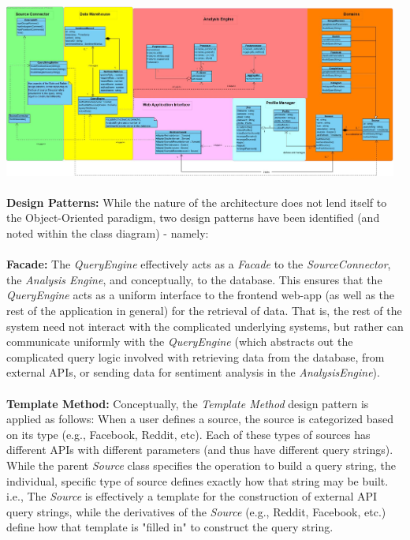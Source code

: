 \documentclass[12pt]{article}
\begin{document}
  \includegraphics[width=13cm]{../../Images/classDiagram2.jpg}\\\\  
  \textbf{Design Patterns:} While the nature of the architecture does not lend itself to the Object-Oriented paradigm, two design patterns have been identified (and noted within the class diagram) - namely:\\\\
  \textbf{Facade:} The \textit{QueryEngine} effectively acts as a \textit{Facade} to the \textit{SourceConnector}, the \textit{Analysis Engine}, and conceptually, to the database. This ensures that the \textit{QueryEngine} acts as a uniform interface to the frontend web-app (as well as the rest of the application in general) for the retrieval of data. That is, the rest of the system need not interact with the complicated underlying systems, but rather can communicate uniformly with the \textit{QueryEngine} (which abstracts out the complicated query logic involved with retrieving data from the database, from external APIs, or sending data for sentiment analysis in the \textit{AnalysisEngine}).\\\\
  \textbf{Template Method:} Conceptually, the \textit{Template Method} design pattern is applied as follows: When a user defines a source, the source is categorized based on its type (e.g., Facebook, Reddit, etc). Each of these types of sources has different APIs with different parameters (and thus have different query strings). While the parent \textit{Source} class specifies the operation to build a query string, the individual, specific type of source defines exactly how that string may be built. i.e., The \textit{Source} is effectively a template for the construction of external API query strings, while the derivatives of the \textit{Source} (e.g., Reddit, Facebook, etc.) define how that template is "filled in" to construct the query string.
\end{document}
